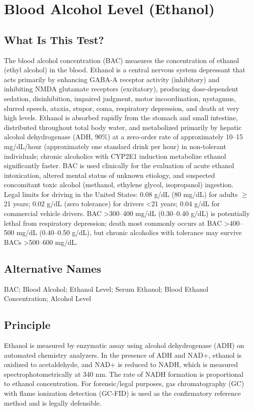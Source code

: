 \chapter{Blood Alcohol Level (Ethanol)}
\section*{What Is This Test?}
The blood alcohol concentration (BAC) measures the concentration of ethanol (ethyl alcohol) in the blood. Ethanol is a central nervous system depressant that acts primarily by enhancing GABA-A receptor activity (inhibitory) and inhibiting NMDA glutamate receptors (excitatory), producing dose-dependent sedation, disinhibition, impaired judgment, motor incoordination, nystagmus, slurred speech, ataxia, stupor, coma, respiratory depression, and death at very high levels. Ethanol is absorbed rapidly from the stomach and small intestine, distributed throughout total body water, and metabolized primarily by hepatic alcohol dehydrogenase (ADH, 90\%) at a zero-order rate of approximately 10--15 mg/dL/hour (approximately one standard drink per hour) in non-tolerant individuals; chronic alcoholics with CYP2E1 induction metabolize ethanol significantly faster. BAC is used clinically for the evaluation of acute ethanol intoxication, altered mental status of unknown etiology, and suspected concomitant toxic alcohol (methanol, ethylene glycol, isopropanol) ingestion. Legal limits for driving in the United States: 0.08 g/dL (80 mg/dL) for adults $\geq$21 years; 0.02 g/dL (zero tolerance) for drivers <21 years; 0.04 g/dL for commercial vehicle drivers. BAC >300--400 mg/dL (0.30--0.40 g/dL) is potentially lethal from respiratory depression; death most commonly occurs at BAC >400--500 mg/dL (0.40--0.50 g/dL), but chronic alcoholics with tolerance may survive BACs >500--600 mg/dL.
\section*{Alternative Names}
BAC; Blood Alcohol; Ethanol Level; Serum Ethanol; Blood Ethanol Concentration; Alcohol Level
\section*{Principle}
Ethanol is measured by enzymatic assay using alcohol dehydrogenase (ADH) on automated chemistry analyzers. In the presence of ADH and NAD+, ethanol is oxidized to acetaldehyde, and NAD+ is reduced to NADH, which is measured spectrophotometrically at 340 nm. The rate of NADH formation is proportional to ethanol concentration. For forensic/legal purposes, gas chromatography (GC) with flame ionization detection (GC-FID) is used as the confirmatory reference method and is legally defensible.

